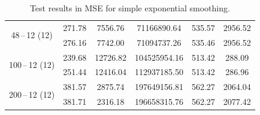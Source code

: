 \begin{table}[h]
\begin{center}
\begin{tabular}{c|c|c|c|c|c}
                \multirow{2}{*}{48\,--\,12 (12)}  & 271.78 & 7556.76 & 71166890.64 & 535.57 & 2956.52 \\
                                                  & 276.16 & 7742.00 & 71094737.26 & 535.46 & 2956.52 \\ \hline
                \multirow{2}{*}{100\,--\,12 (12)} & 239.68 & 12726.82 & 104525954.16 & 513.42 & 288.09 \\
                                                  & 251.44 & 12416.04 & 112937185.50 & 513.42 & 286.96 \\ \hline
                \multirow{2}{*}{200\,--\,12 (12)} & 381.57 & 2875.74 & 197649156.81 & 562.27 & 2064.04 \\
                                                  & 381.71 & 2316.18 & 196658315.76 & 562.27 & 2077.42 \\ \hline
            \end{tabular}
            \caption{Test results in MSE for simple exponential smoothing.}
            \label{appen:tab:simple-results}
        \end{center}
    \end{table}

